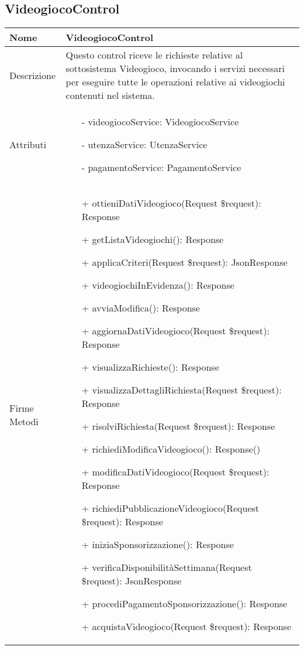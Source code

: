 \newpage
\subsection{VideogiocoControl}
\small\begin{tabular}{|| l | p{28em} ||} 
	\hline
	Nome & VideogiocoControl\\
	\hline
	Descrizione & Questo control riceve le richieste relative al sottosistema Videogioco, invocando i servizi necessari per eseguire tutte le operazioni relative ai videogiochi contenuti nel sistema. \\
	\hline
	Attributi & \begin{itemize}
		\item[-] videogiocoService: VideogiocoService
		\item[-] utenzaService: UtenzaService
		\item[-] pagamentoService: PagamentoService
	\end{itemize}\\
	\hline
	Firme Metodi & \begin{itemize}
		\item[+] ottieniDatiVideogioco(Request \$request): Response
		\item[+] getListaVideogiochi(): Response
		\item[+] applicaCriteri(Request \$request): JsonResponse
		\item[+] videogiochiInEvidenza(): Response
		\item[+] avviaModifica(): Response
		\item[+] aggiornaDatiVideogioco(Request \$request): Response
		\item[+] visualizzaRichieste(): Response
		\item[+] visualizzaDettagliRichiesta(Request \$request): Response
		\item[+] risolviRichiesta(Request \$request): Response
		\item[+] richiediModificaVideogioco(): Response()
		\item[+] modificaDatiVideogioco(Request \$request): Response
		\item[+] richiediPubblicazioneVideogioco(Request \$request): Response
		\item[+] iniziaSponsorizzazione(): Response
		\item[+] verificaDisponibilitàSettimana(Request \$request): JsonResponse
		\item[+] procediPagamentoSponsorizzazione(): Response
		\item[+] acquistaVideogioco(Request \$request): Response

\end{itemize}
\end{tabular}
